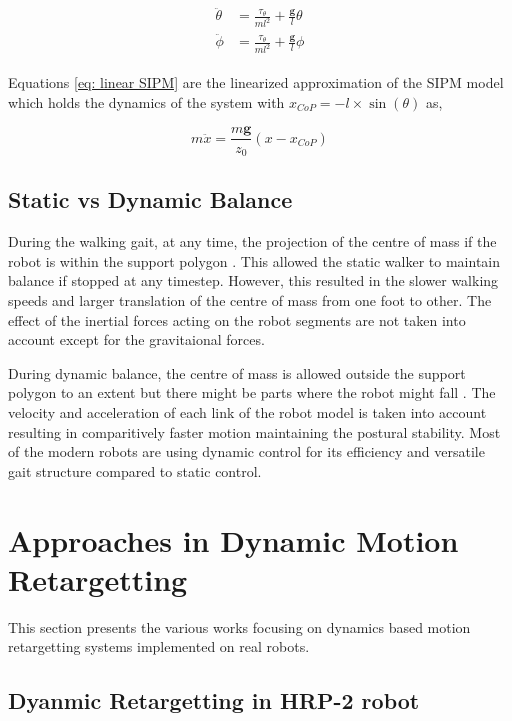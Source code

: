 \begin{align}
    \label{eq: linear SIPM}
    \begin{split}
        \ddot{\theta} &= \frac{\tau_\theta}{ml^2} + \frac{\mathbf{g}}{l}\theta \\
        \ddot{\phi} &= \frac{\tau_\theta}{ml^2} + \frac{\mathbf{g}}{l}\phi
    \end{split}
\end{align}


Equations \ref{eq: linear SIPM} are the linearized approximation of the SIPM model which holds the dynamics of the system with $x_{CoP} = -l \times \sin(\theta)$ as,

\begin{equation}
    \label{eq: CoP SIPM}
    m\ddot{x} = \frac{m\mathbf{g}}{z_0}(x - x_{CoP})
\end{equation}

\subsection{Static vs Dynamic Balance}

During the walking gait, at any time, the projection of the centre of mass if the robot is within the support
polygon \cite{katic2003survey}. This allowed the static walker to maintain balance if stopped at any timestep.
However, this resulted in the slower walking speeds and larger translation of the centre of mass from one foot to
other. The effect of the inertial forces acting on the robot segments are not taken into account except for the 
gravitaional forces.

During dynamic balance, the centre of mass is allowed outside the support polygon to an extent but there might be 
parts where the robot might fall \cite{katic2003survey}. The velocity and acceleration of each link of the robot
model is taken into account resulting in comparitively faster motion maintaining the postural stability. Most of the
modern robots are using dynamic control for its efficiency and versatile gait structure compared to static control.


\section{Approaches in Dynamic Motion Retargetting}

This section presents the various works focusing on dynamics based motion retargetting systems implemented on real robots.

\subsection{Dyanmic Retargetting in HRP-2 robot}

